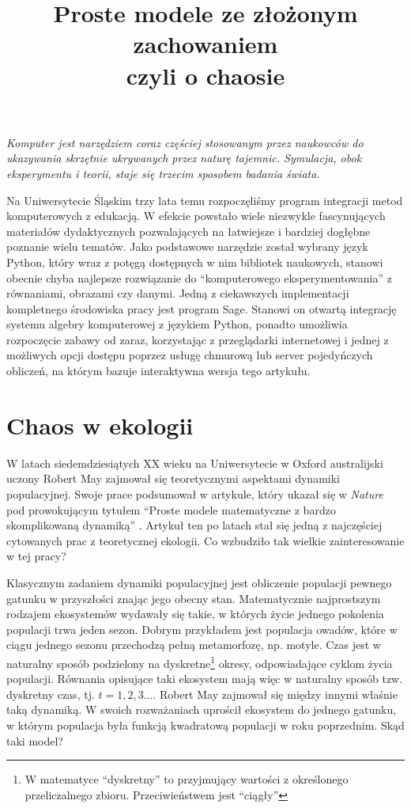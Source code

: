\documentclass[12pt]{article}
\title{Proste modele ze złożonym zachowaniem \\ czyli o chaosie}
\begin{document}
\maketitle
\lstset{language=Python}


{\em Komputer jest narzędziem coraz częściej stosowanym przez naukowców do
ukazywania skrzętnie ukrywanych przez naturę tajemnic. Symulacja, obok
eksperymentu i teorii, staje się trzecim sposobem badania świata. }


Na Uniwersytecie Śląskim trzy lata temu rozpoczęliśmy program
integracji metod komputerowych z edukacją. W efekcie powstało wiele
niezwykle fascynujących materiałów dydaktycznych pozwalających na
łatwiejsze i bardziej dogłębne poznanie wielu tematów. Jako podstawowe
narzędzie został wybrany język Python, który wraz z potęgą dostępnych
w nim bibliotek naukowych, stanowi obecnie chyba najlepsze rozwiązanie
do ``komputerowego eksperymentowania'' z równaniami, obrazami czy
danymi. Jedną z ciekawszych implementacji kompletnego środowiska pracy
jest program Sage\cite{sagemath}. Stanowi on otwartą integrację
systemu algebry komputerowej z językiem Python, ponadto umożliwia
rozpoczęcie zabawy od zaraz, korzystając z przeglądarki internetowej i
jednej z możliwych opcji dostępu poprzez usługę chmurową\cite{cloud}
lub server pojedyńczych obliczeń, na którym bazuje interaktywna wersja
tego artykułu\cite{web}.



\section{Chaos w ekologii}

W latach siedemdziesiątych XX wieku na Uniwersytecie w Oxford
australijski uczony Robert May zajmował się teoretycznymi aspektami
dynamiki populacyjnej. Swoje prace podsumował w artykule, który ukazał
się w \emph{Nature} pod prowokującym tytułem ``Proste modele
matematyczne z bardzo skomplikowaną dynamiką'' \cite{may76}. Artykuł
ten po latach stał się jedną z najczęściej cytowanych prac z
teoretycznej ekologii. Co wzbudziło tak wielkie zainteresowanie w tej
pracy?

Klasycznym zadaniem dynamiki populacyjnej jest obliczenie populacji
pewnego gatunku w przyszłości znając jego obecny stan. Matematycznie
najprostszym rodzajem ekosystemów wydawały się takie, w których życie
jednego pokolenia populacji trwa jeden sezon. Dobrym przykładem jest
populacja owadów, które w ciągu jednego sezonu przechodzą pełną
metamorfozę, np. motyle. Czas jest w naturalny sposób podzielony na
dyskretne\footnote{W matematyce ``dyskretny'' to przyjmujący wartości
  z określonego przeliczalnego zbioru. Przeciwieństwem jest
  ``ciągły''} okresy, odpowiadające cyklom życia populacji. Równania
opisujące taki ekosystem mają więc w naturalny sposób tzw. dyskretny
czas, tj. $t=1,2,3...$. Robert May zajmował się między innymi właśnie
taką dynamiką. W swoich rozważaniach uprościł ekosystem do jednego
gatunku, w którym populacja była funkcją kwadratową populacji w roku
poprzednim. Skąd taki model?
\end{document}
